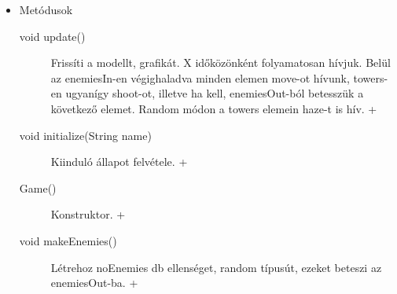 \begin{itemize}
\begin{description}
		
	\end{description}
\item Metódusok\\
	\begin{description}
		\item[void update()] Frissíti a modellt, grafikát. X időközönként folyamatosan hívjuk. Belül az enemiesIn-en végighaladva minden elemen move-ot hívunk, towers-en ugyanígy shoot-ot, illetve ha kell, enemiesOut-ból betesszük a következő elemet. Random módon a towers elemein haze-t is hív. +
\item[void initialize(String name)] Kiinduló állapot felvétele. +
\item[Game()] Konstruktor. +
\item[void makeEnemies()] Létrehoz noEnemies db ellenséget, random típusút, ezeket beteszi az enemiesOut-ba. +

		
		
	\end{description}
\end{itemize}

